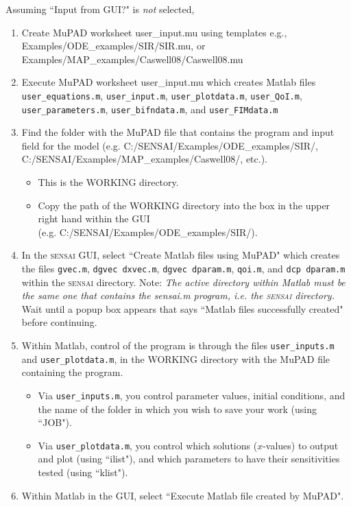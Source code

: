 \documentclass[12pt]{article}
\newcommand{\sensai}{\textsc{sensai}}
\begin{document}
Assuming ``Input from GUI?" is {\em not} selected,
\begin{enumerate}
    \item Create MuPAD worksheet {\sf user\_input.mu} using templates e.g., \\ {\sf Examples/ODE\_examples/SIR/SIR.mu}, or \\ {\sf Examples/MAP\_examples/Caswell08/Caswell08.mu}
    \item Execute MuPAD worksheet {\sf user\_input.mu} which creates M{\sc atlab} files {\tt user\_equations.m}, {\tt user\_input.m}, {\tt user\_plotdata.m}, {\tt user\_QoI.m}, {\tt user\_parameters.m}, {\tt user\_bifndata.m}, and {\tt user\_FIMdata.m}
    \item Find the folder with the MuPAD file that contains the program and input field for the model  (e.g. {\sf C:/SENSAI/Examples/ODE\_examples/SIR/},\\ {\sf C:/SENSAI/Examples/MAP\_examples/Caswell08/}, etc.).
    \begin{itemize}
        \item This is the WORKING directory.
        \item Copy the path of the WORKING directory into the box in the upper right hand within the GUI \\
              (e.g. {\sf C:/SENSAI/Examples/ODE\_examples/SIR/}).
    \end{itemize}
    \item In the {\sensai}  GUI, select ``Create M{\sc atlab}  files using MuPAD" which creates the files {\tt gvec.m}, {\tt dgvec dxvec.m}, {\tt dgvec dparam.m}, {\tt qoi.m}, and {\tt dcp dparam.m} within the {\sensai} directory.  Note: \textit{The active directory within M{\sc atlab} must be the same one that contains the sensai.m program, i.e. the {\sensai} directory.}  Wait until a popup box appears that says ``M{\sc atlab} files successfully created" before continuing.
    \item Within M{\sc atlab}, control of the program is through the files {\tt user\_inputs.m} and {\tt user\_plotdata.m}, in the WORKING directory with the MuPAD file containing the program.
    \begin{itemize}
        \item Via {\tt user\_inputs.m}, you control parameter values, initial conditions, and the name of the folder in which you wish to save your work (using ``JOB").
        \item Via {\tt user\_plotdata.m}, you control which solutions ($x$-values) to output and plot (using ``ilist"), and which parameters to have their sensitivities tested (using ``klist").
    \end{itemize}

    \item Within M{\sc atlab} in the GUI, select ``Execute M{\sc atlab} file created by MuPAD".

\end{enumerate}
\end{document}
